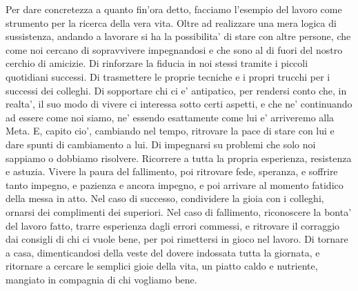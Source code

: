 Per dare concretezza a quanto fin'ora detto, facciamo l'esempio del lavoro come strumento per la ricerca della vera vita. Oltre ad realizzare una mera logica di sussistenza, andando a lavorare si ha la possibilita' di stare con altre persone, che come noi cercano di sopravvivere impegnandosi e che sono al di fuori del nostro cerchio di amicizie. Di rinforzare la fiducia in noi stessi tramite i piccoli quotidiani successi. Di trasmettere le proprie tecniche e i propri trucchi per i successi dei colleghi. Di sopportare chi ci e' antipatico, per rendersi conto che, in realta', il suo modo di vivere ci interessa sotto certi aspetti, e che ne' continuando ad essere come noi siamo, ne' essendo esattamente come lui e' arriveremo alla Meta. E, capito cio', cambiando nel tempo, ritrovare la pace di stare con lui e dare spunti di cambiamento a lui. Di impegnarsi su problemi che solo noi sappiamo o dobbiamo risolvere. Ricorrere a tutta la propria esperienza, resistenza e astuzia. Vivere la paura del fallimento, poi ritrovare fede, speranza, e soffrire tanto impegno, e pazienza e ancora impegno, e poi arrivare al momento fatidico della messa in atto. Nel caso di successo, condividere la gioia con i colleghi, ornarsi dei complimenti dei superiori. Nel caso di fallimento, riconoscere la bonta' del lavoro fatto, trarre esperienza dagli errori commessi, e ritrovare il corraggio dai consigli di chi ci vuole bene, per poi rimettersi in gioco nel lavoro.  Di tornare a casa, dimenticandosi della veste del dovere indossata tutta la giornata, e ritornare a cercare le semplici gioie della vita, un piatto caldo e nutriente, mangiato in compagnia di chi vogliamo bene.

